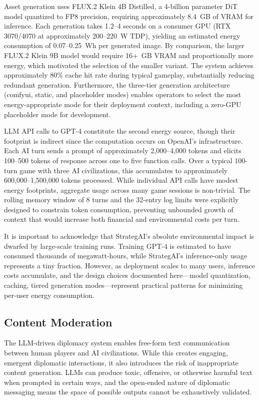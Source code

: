 \documentclass[conference]{IEEEtran}
\begin{document}
Asset generation uses FLUX.2 Klein 4B Distilled, a 4-billion parameter DiT model quantized to FP8 precision, requiring approximately 8.4~GB of VRAM for inference. Each generation takes 1.2--4 seconds on a consumer GPU (RTX 3070/4070 at approximately 200--220~W TDP), yielding an estimated energy consumption of 0.07--0.25~Wh per generated image. By comparison, the larger FLUX.2 Klein 9B model would require 16+~GB VRAM and proportionally more energy, which motivated the selection of the smaller variant. The system achieves approximately 80\% cache hit rate during typical gameplay, substantially reducing redundant generation. Furthermore, the three-tier generation architecture (comfyui, static, and placeholder modes) enables operators to select the most energy-appropriate mode for their deployment context, including a zero-GPU placeholder mode for development.

LLM API calls to GPT-4 constitute the second energy source, though their footprint is indirect since the computation occurs on OpenAI's infrastructure. Each AI turn sends a prompt of approximately 2,000--4,000 tokens and elicits 100--500 tokens of response across one to five function calls. Over a typical 100-turn game with three AI civilizations, this accumulates to approximately 600,000--1,500,000 tokens processed. While individual API calls have modest energy footprints, aggregate usage across many game sessions is non-trivial. The rolling memory window of 8 turns and the 32-entry log limits were explicitly designed to constrain token consumption, preventing unbounded growth of context that would increase both financial and environmental costs per turn.

It is important to acknowledge that StrategAI's absolute environmental impact is dwarfed by large-scale training runs. Training GPT-4 is estimated to have consumed thousands of megawatt-hours, while StrategAI's inference-only usage represents a tiny fraction. However, as deployment scales to many users, inference costs accumulate, and the design choices documented here---model quantization, caching, tiered generation modes---represent practical patterns for minimizing per-user energy consumption.

\subsection{Content Moderation}

The LLM-driven diplomacy system enables free-form text communication between human players and AI civilizations. While this creates engaging, emergent diplomatic interactions, it also introduces the risk of inappropriate content generation. LLMs can produce toxic, offensive, or otherwise harmful text when prompted in certain ways, and the open-ended nature of diplomatic messaging means the space of possible outputs cannot be exhaustively validated.
\end{document}
